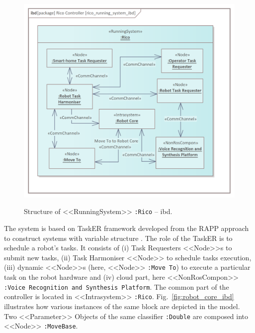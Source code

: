 \documentclass{ieeeaccess}
\begin{document}
	\begin{figure}[htb]
		\centering
		\begin{center}
			{\includegraphics[scale=0.7]{img/rico_pkg/rico_running_system_ibd.png}}
		\end{center}
		\caption{Structure of <<RunningSystem>> \texttt{:Rico} -- ibd.} 
		\label{fig:rico_running_system_ibd}
	\end{figure}

	The system is based on TaskER framework \cite{tasker2020} developed from the RAPP approach to construct systems with variable structure \cite{zielinski2017variable}. The role of the TaskER is to schedule a robot’s tasks. It consists of (i) Task Requesters <<Node>>s to submit new tasks, (ii) Task Harmoniser <<Node>> to schedule tasks execution, (iii) dynamic <<Node>>s (here, <<Node>> \texttt{:Move To}) to execute a particular task on the robot hardware and (iv) cloud part, here <<NonRosCompon>> \texttt{:Voice Recognition and Synthesis Platform}. The common part of the controller is located in <<Intrasystem>> \texttt{:Rico}.
	Fig.~\ref{fig:robot_core_ibd} illustrates how various instances of the same block are depicted in the model. Two <<Parameter>> Objects of the same classifier \texttt{:Double} are composed into <<Node>> \texttt{:MoveBase}.
	
\end{document}

